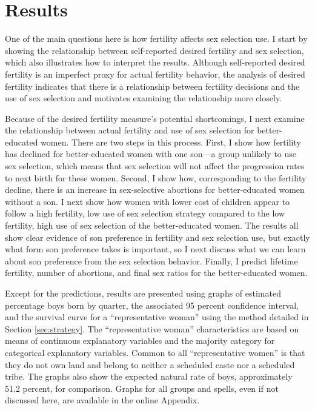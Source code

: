 \documentclass[12pt,letterpaper]{article}
\begin{document}
\section{Results\label{sec:results}}

One of the main questions here is how fertility affects sex selection use.
I start by showing the relationship between self-reported desired fertility and sex 
selection, which also illustrates how to interpret the results.
Although self-reported desired fertility is an imperfect proxy for actual
fertility behavior, the analysis of desired fertility indicates that there is 
a relationship between fertility decisions and the use of sex selection and motivates 
examining the relationship more closely.

Because of the desired fertility measure's potential shortcomings, I next examine the 
relationship between actual fertility and use of sex selection for better-educated women.
There are two steps in this process.
First, I show how fertility has declined for better-educated women with one son---a group 
unlikely to use sex selection, which means that sex selection will not affect the 
progression rates to next birth for these women.
Second, I show how, corresponding to the fertility decline, there is an increase in
sex-selective abortions for better-educated women without a son.
I next show how women with lower cost of children appear to follow a high fertility, low
use of sex selection strategy compared to the low fertility, high use of sex selection of
the better-educated women.
The results all show clear evidence of son preference in fertility and sex selection use, 
but exactly what form son preference takes is important, so I next discuss what we can
learn about son preference from the sex selection behavior.
Finally, I predict lifetime fertility, number of abortions, and final sex ratios for
the better-educated women.

Except for the predictions, results are presented using graphs of estimated percentage boys 
born by quarter, the associated 95 percent confidence interval, and the survival curve for 
a ``representative woman'' using the method detailed in Section \ref{sec:strategy}.
The ``representative woman'' characteristics are based on means of continuous 
explanatory variables and the majority category for categorical explanatory variables.
Common to all ``representative women'' is that they do not own land and belong to neither 
a scheduled caste nor a scheduled tribe.
The graphs also show the expected natural rate of boys, approximately 51.2 percent, for
comparison.
Graphs for all groups and spells, even if not discussed here, are available in 
the online Appendix.
\end{document}

